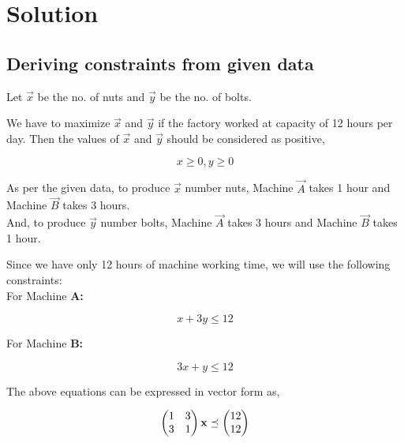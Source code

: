 \documentclass[journal,10pt,twocolumn]{article}
\begin{document}
\section{Solution}
\subsection{Deriving constraints from given data}
\begin{flushleft}
Let $\vec{x}$ be the no. of nuts and $\vec{y}$ be the no. of bolts.\\
\end{flushleft}
\vspace{0.25cm}

\begin{flushleft}
We have to maximize $\vec{x}$ and $\vec{y}$ if the factory worked at capacity of 12 hours per day. Then the values of $\vec{x}$ and $\vec{y}$ should be considered as positive, \\
\end{flushleft}
\begin{equation}
x\ge 0,   y\ge 0
\end{equation}

\begin{flushleft}
As per the given data, to produce $\vec{x}$ number nuts, Machine $\vec{A}$ takes 1 hour and Machine $\vec{B}$ takes 3 hours.\\
And, to produce $\vec{y}$ number bolts, Machine $\vec{A}$ takes 3 hours and Machine $\vec{B}$ takes 1 hour.\\
\end{flushleft}
\begin{flushleft}
Since we have only 12 hours of machine working time, we will use the following constraints:\\
\vspace{0.2cm}
For Machine \textbf{A:}
\end{flushleft}
\begin{equation}
x+3y \le 12
\end{equation}
\begin{flushleft}
For Machine \textbf{B:}
\end{flushleft}
\begin{equation}
3x+y \le 12  
\end{equation}
\begin{flushleft}
The above equations can be expressed in vector form as,
\end{flushleft}
\vspace{0.15cm}
\begin{equation}
    \begin{pmatrix}1 & 3 \\ 3 & 1\end{pmatrix} \mathbf{x} \preceq \begin{pmatrix}12\\12\end{pmatrix}
\end{equation}
\end{document}
